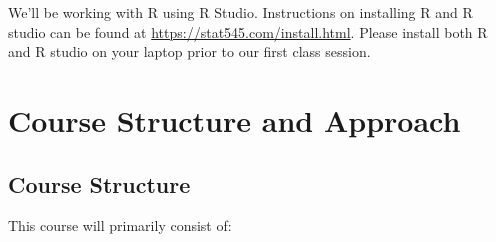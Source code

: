 \documentclass[11pt,]{article}
\begin{document}
We'll be working with R using R Studio. Instructions on installing R and
R studio can be found at \url{https://stat545.com/install.html}. Please
install both R and R studio on your laptop prior to our first class
session.

\hypertarget{course-structure-and-approach}{%
\section{Course Structure and
Approach}\label{course-structure-and-approach}}

\hypertarget{course-structure}{%
\subsection{Course Structure}\label{course-structure}}

This course will primarily consist of:
\end{document}

